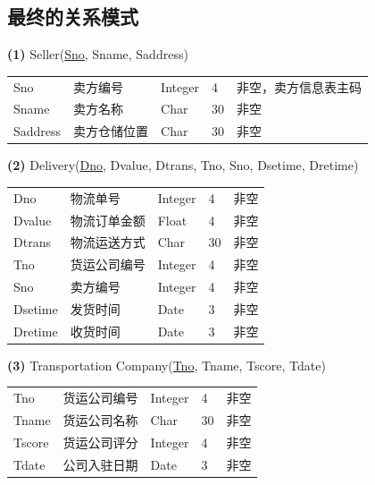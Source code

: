 \documentclass[12pt]{article}
\begin{document}
\subsection{最终的关系模式}

\noindent \textbf{(1)} Seller(\uline{Sno}, Sname, Saddress)

\begin{center}
	\begin{tabular}{lllll}
		\toprule
		Sno &	卖方编号 &	Integer &	4 &	非空，卖方信息表主码 \\
		Sname &	卖方名称 &	Char &	30 &	非空 \\
		Saddress &	卖方仓储位置 &	Char &	30 &	非空 \\
		\bottomrule
	\end{tabular}
\end{center}

\vspace{0.5cm}
\noindent \textbf{(2)} Delivery(\uline{Dno}, Dvalue, Dtrans, Tno, Sno, Dsetime, Dretime)

\begin{center}
	\begin{tabular}{lllll}
		\toprule
		Dno &	物流单号 &	Integer &	4 &	非空 \\
		Dvalue &	物流订单金额 &	Float &	4 &	非空 \\
		Dtrans &	物流运送方式 &	Char &	30 &	非空 \\
		Tno &	货运公司编号 &	Integer &	4 &	非空 \\
		Sno &	卖方编号 &	Integer &	4 &	非空 \\
		Dsetime & 发货时间 & Date & 3  & 非空 \\
		Dretime & 收货时间 & Date & 3  & 非空 \\
		\bottomrule
	\end{tabular}
\end{center}

\vspace{0.5cm}
\noindent \textbf{(3)} Transportation Company(\uline{Tno}, Tname, Tscore, Tdate)

\begin{center}
	\begin{tabular}{lllll}
		\toprule
		Tno &	货运公司编号 &	Integer &	4 &	非空 \\
		Tname &	货运公司名称 &	Char &	30 &	非空 \\
		Tscore & 货运公司评分 & Integer & 4 & 非空 \\
		Tdate & 公司入驻日期 & Date  & 3 & 非空 \\
		\bottomrule
	\end{tabular}
\end{center}
\end{document}
